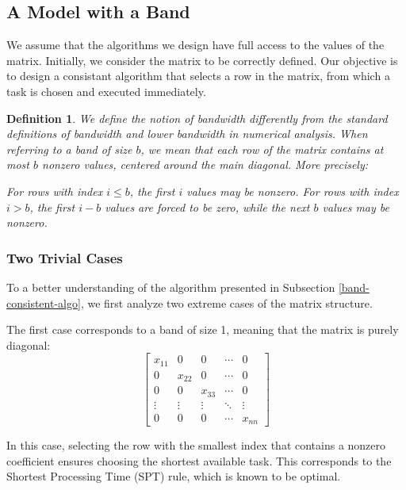 \documentclass{article}
\newtheorem{definition}{Definition}
\begin{document}
\subsection{A Model with a Band}
We assume that the algorithms we design have full access to the values of the matrix. Initially, we consider the matrix to be correctly defined. Our objective is to design a consistant algorithm that selects a row in the matrix, from which a task is chosen and executed immediately.

\begin{definition}
We define the notion of \emph{bandwidth} differently from the standard definitions of bandwidth and lower bandwidth in numerical analysis. When referring to a band of size $b$, we mean that each row of the matrix contains at most $b$ nonzero values, centered around the main diagonal. More precisely:

For rows with index $i \leq b$, the first $i$ values may be nonzero.
For rows with index $i > b$, the first $i - b$ values are forced to be zero, while the next $b$ values may be nonzero.
\end{definition}

\subsubsection{Two Trivial Cases}To a better understanding of  the algorithm presented in Subsection \ref{band-consistent-algo}, we first analyze two extreme cases of the matrix structure.

The first case corresponds to a band of size 1, meaning that the matrix is purely diagonal:  
\[
\begin{bmatrix}  
x_{11} & 0 & 0 & \cdots & 0 \\  
0 & x_{22} & 0 & \cdots & 0 \\  
0 & 0 & x_{33} & \cdots & 0 \\  
\vdots & \vdots & \vdots & \ddots & \vdots \\  
0 & 0 & 0 & \cdots & x_{nn}  
\end{bmatrix}  
\]

In this case, selecting the row with the smallest index that contains a nonzero coefficient ensures choosing the shortest available task. This corresponds to the Shortest Processing Time (SPT) rule, which is known to be optimal.
\end{document}
